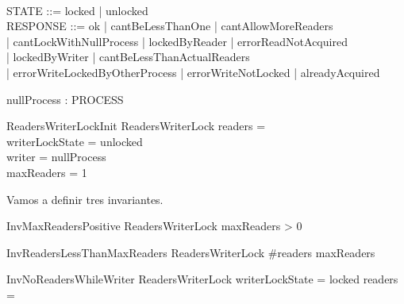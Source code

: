 \documentclass{article}
\begin{document}
\begin{zed}
[PROCESS] \\
\also
STATE ::= locked | unlocked\\
\also
RESPONSE ::= ok | cantBeLessThanOne | cantAllowMoreReaders \\
| cantLockWithNullProcess | lockedByReader | errorReadNotAcquired \\
| lockedByWriter | cantBeLessThanActualReaders \\
| errorWriteLockedByOtherProcess | errorWriteNotLocked | alreadyAcquired
\end{zed}

\begin{axdef}
nullProcess : PROCESS
\end{axdef}


\begin{schema}{ReadersWriterLockInit}
    ReadersWriterLock
\where
    readers = \emptyset \\
    writerLockState = unlocked \\
    writer = nullProcess \\
    maxReaders = 1
\end{schema}

Vamos a definir tres invariantes. 


\begin{schema}{InvMaxReadersPositive}
    ReadersWriterLock
\where
    maxReaders > 0
\end{schema}

\begin{schema}{InvReadersLessThanMaxReaders}
    ReadersWriterLock
\where
    \#readers \leq maxReaders
\end{schema}

\begin{schema}{InvNoReadersWhileWriter}
    ReadersWriterLock
\where
    writerLockState = locked \implies readers = \emptyset
\end{schema}

\end{document}
